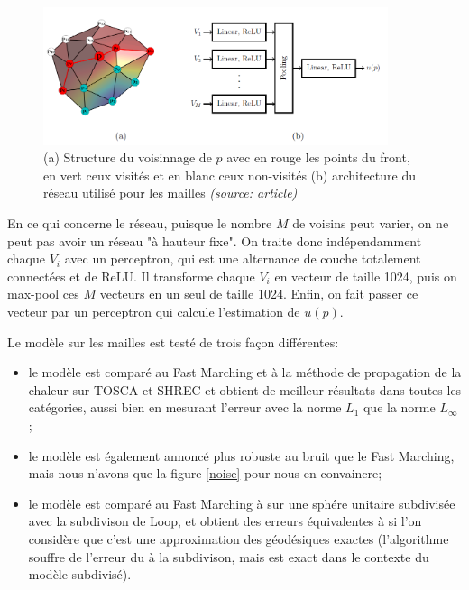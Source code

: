 \documentclass[11pt]{article} %
\begin{document}
\begin{figure}[h]
\centering
\includegraphics[width=0.9\textwidth]{imgs/meshN}
\caption{(a) Structure du voisinnage de $p$ avec en rouge les points du front, en vert ceux visités et en blanc ceux non-visités (b) architecture du réseau utilisé pour les mailles \textit{(source: article)}}
\label{meshN}
\end{figure}

En ce qui concerne le réseau, puisque le nombre $M$ de voisins peut varier, on ne peut pas avoir un réseau "à hauteur fixe". On traite donc indépendamment chaque $V_i$ avec un perceptron, qui est une alternance de couche totalement connectées et de ReLU. Il transforme chaque $V_i$ en vecteur de taille 1024, puis on max-pool ces $M$ vecteurs en un seul de taille 1024. Enfin, on fait passer ce vecteur par un perceptron qui calcule l'estimation de $u(p)$.

Le modèle sur les mailles est testé de trois façon différentes:

\begin{itemize}
\item le modèle est comparé au Fast Marching et à la méthode de propagation de la chaleur \cite{HeatMethod} sur TOSCA \cite{TOSCAbook} et SHREC \cite{SHRECpaper} et obtient de meilleur résultats dans toutes les catégories, aussi bien en mesurant l'erreur avec la norme $L_1$ que la norme $L_\infty$ ;
\item le modèle est également annoncé plus robuste au bruit que le Fast Marching, mais nous n'avons que la figure \ref{noise} pour nous en convaincre;
\item le modèle est comparé au Fast Marching à \cite{ExactGeodesics} sur une sphére unitaire subdivisée avec la subdivison de Loop, et obtient des erreurs équivalentes à \cite{ExactGeodesics} si l'on considère que c'est une approximation des géodésiques exactes (l'algorithme \cite{ExactGeodesics} souffre de l'erreur du à la subdivison, mais est exact dans le contexte du modèle subdivisé). 
\end{itemize}
\end{document}
